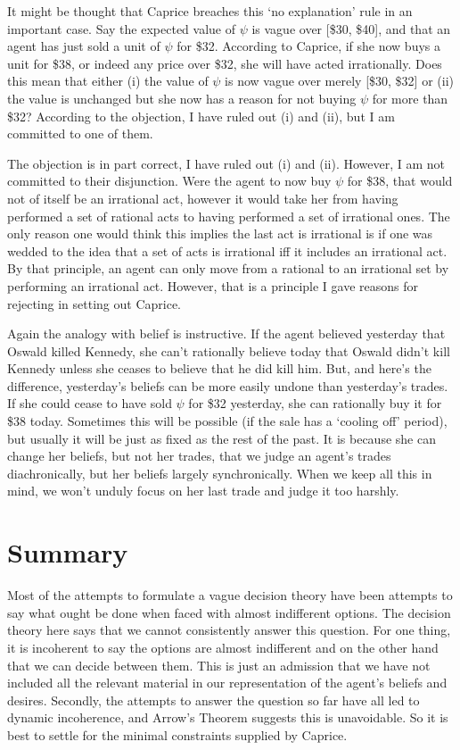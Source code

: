 It might be thought that Caprice breaches this `no explanation' rule in
an important case. Say the expected value of $\psi$ is vague over {[}\$30,
\$40{]}, and that an agent has just sold a unit of $\psi$ for \$32. According
to Caprice, if she now buys a unit for \$38, or indeed any price over
\$32, she will have acted irrationally. Does this mean that either (i)
the value of $\psi$ is now vague over merely {[}\$30, \$32{]} or (ii) the
value is unchanged but she now has a reason for not buying $\psi$ for more
than \$32? According to the objection, I have ruled out (i) and (ii),
but I am committed to one of them.

The objection is in part correct, I have ruled out (i) and (ii).
However, I am not committed to their disjunction. Were the agent to now
buy $\psi$ for \$38, that would not of itself be an irrational act, however
it would take her from having performed a set of rational acts to having
performed a set of irrational ones. The only reason one would think this
implies the last act is irrational is if one was wedded to the idea that
a set of acts is irrational iff it includes an irrational act. By that
principle, an agent can only move from a rational to an irrational set
by performing an irrational act. However, that is a principle I gave
reasons for rejecting in setting out Caprice.

Again the analogy with belief is instructive. If the agent believed
yesterday that Oswald killed Kennedy, she can't rationally believe today
that Oswald didn't kill Kennedy unless she ceases to believe that he did
kill him. But, and here's the difference, yesterday's beliefs can be
more easily undone than yesterday's trades. If she could cease to have
sold $\psi$ for \$32 yesterday, she can rationally buy it for \$38 today.
Sometimes this will be possible (if the sale has a `cooling off'
period), but usually it will be just as fixed as the rest of the past.
It is because she can change her beliefs, but not her trades, that we
judge an agent's trades diachronically, but her beliefs largely
synchronically. When we keep all this in mind, we won't unduly focus on
her last trade and judge it too harshly.

\hypertarget{summary}{%
\section{Summary}\label{summary}}

Most of the attempts to formulate a vague decision theory have been
attempts to say what ought be done when faced with almost indifferent
options. The decision theory here says that we cannot consistently
answer this question. For one thing, it is incoherent to say the options
are almost indifferent and on the other hand that we can decide between
them. This is just an admission that we have not included all the
relevant material in our representation of the agent's beliefs and
desires. Secondly, the attempts to answer the question so far have all
led to dynamic incoherence, and Arrow's Theorem suggests this is
unavoidable. So it is best to settle for the minimal constraints
supplied by Caprice.


